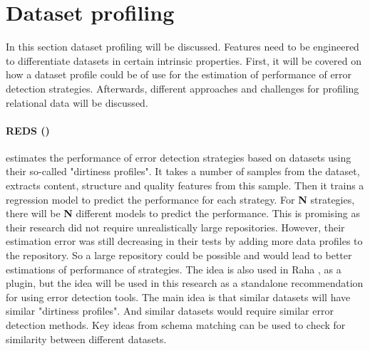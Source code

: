 \section{Dataset profiling}
In this section dataset profiling will be discussed. Features need to be engineered to differentiate datasets in certain intrinsic properties. First, it will be covered on how a dataset profile could be of use for the estimation of performance of error detection strategies. Afterwards, different approaches and challenges for profiling relational data will be discussed.

\paragraph{REDS (\cite{Mahdavi2019-pk})} estimates the performance of error detection strategies based on datasets using their so-called "dirtiness profiles". It takes a number of samples from the dataset, extracts content, structure and quality features from this sample. Then it trains a regression model to predict the performance for each strategy. For \textbf{N} strategies, there will be \textbf{N} different models to predict the performance.
This is promising as their research did not require unrealistically large repositories. However, their estimation error was still decreasing in their tests by adding more data profiles to the repository.
So a large repository could be possible and would lead to better estimations of performance of strategies.
The idea is also used in Raha \cite{Mahdavi2019-zf}, as a plugin, but the idea will be used in this research as a standalone recommendation for using error detection tools. The main idea is that similar datasets will have similar "dirtiness profiles". And similar datasets would require similar error detection methods. Key ideas from schema matching can be used to check for similarity between different datasets.

